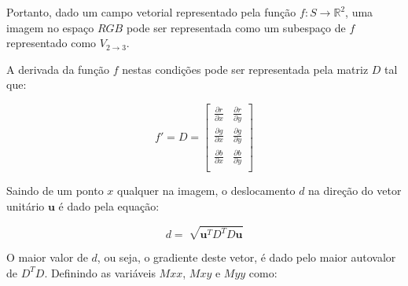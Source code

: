 Portanto, dado um campo vetorial representado pela função $ f: S \to \mathbb{R}^2 $, uma imagem no espaço $RGB$ pode ser representada como um subespaço de $f$ representado como $ V_{2 \to 3} $.





A derivada da função $f$ nestas condições pode ser representada pela matriz $D$ tal que:

$$ f' = D = \begin{bmatrix} 
\frac{\partial r}{\partial x} & \frac{\partial r}{\partial y} \\
\frac{\partial g}{\partial x} & \frac{\partial g}{\partial y} \\
\frac{\partial b}{\partial x} & \frac{\partial b}{\partial y} \\ 
\end{bmatrix} $$

Saindo de um ponto $x$ qualquer na imagem, o deslocamento $d$ na direção do vetor unitário $\textbf{u}$ é dado pela equação:

$$d = \sqrt[]{\textbf{u}^TD^TD\textbf{u}}$$

O maior valor de $d$, ou seja, o gradiente deste vetor, é dado pelo maior autovalor de $D^TD$. Definindo as variáveis $Mxx$, $Mxy$ e $Myy$ como:

